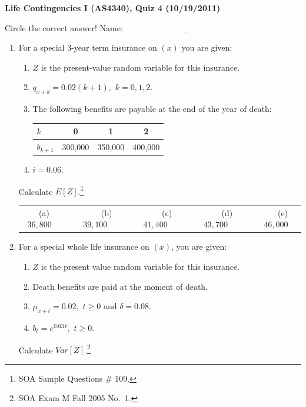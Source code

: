 \documentclass[11pt,fleqn,oneside]{book}
\begin{document}
\thispagestyle{empty}
\setcounter{page}{1}
\begin{center}
{ \large \bf Life Contingencies I (AS4340), Quiz 4 (10/19/2011)}
\end{center}
\noindent
Circle the correct answer! Name: $\underline{\;\;\;\;\;\;\;\;\;\;\;\;\;\;\;\;\;\;\;\;\;\;\;\;\;\;\;\;\;\;\;\;\;\;\;\;\;\;\;\;\;\;\;\;\;\;\;\;\;\;\;\;\;}$
\begin{enumerate}
\item For a special 3-year term insurance on $(x)$ you are given: 
\begin{enumerate}
\item $Z$ is the present-value random variable for this insurance.
\item $q_{x+k} = 0.02(k+1),$ $k=0,1,2$.
\item The following benefits are payable at the end of the year of death:
\begin{center}
\begin{tabular}{l || c | c | c}
$k$ & 0 & 1 & 2\\
\hline
\hline
$b_{k+1}$ & 300,000 & 350,000 & 400,000 \\
\end{tabular}
\end{center}
\item $i=0.06$.
\end{enumerate}
Calculate $E[Z]$.\footnote[1]{SOA Sample Questions \# 109.}

\begin{center}
\small
\begin{tabular}{c c c c c}
(a) $36,800\;\;\;\;$ & 
$\;\;\;\;\;\;$(b) $39,100\;\;\;\;$ &
$\;\;\;\;\;\;$(c) $41,400\;\;\;\;$ & 
$\;\;\;\;\;\;$(d) $43,700\;\;\;\;$ &
$\;\;\;\;\;\;$(e) $46,000$
\end{tabular}
\end{center}

\normalsize


\item For a special whole life insurance on $(x)$, you are given:
\begin{enumerate}
\item $Z$ is the present value random variable for this insurance.
\item Death benefits are paid at the moment of death.
\item $\mu_{x+t} = 0.02,$ $t \geq 0$ and $\delta =0.08.$
\item $b_t = e^{0.03\,t},$ $t \geq 0$.
\end{enumerate}
Calculate $Var[Z]$.\footnote[2]{SOA Exam M Fall 2005 No.\ 1.} 


\end{enumerate}
\end{document}
